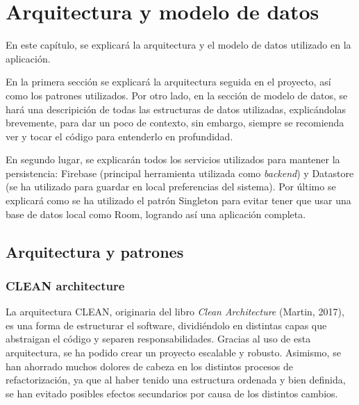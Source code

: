\chapter{Arquitectura y modelo de datos}
\label{cap:modeloDeDatos}
En este capítulo, se explicará la arquitectura y el modelo de datos utilizado en la aplicación. 

En la primera sección se explicará la arquitectura seguida en el proyecto, así como los patrones utilizados. Por otro lado, en la sección de modelo de datos, se hará una descripición de todas las estructuras de datos utilizadas, explicándolas brevemente, para dar un poco de contexto, sin embargo, siempre se recomienda ver y tocar el código para entenderlo en profundidad. 

En segundo lugar, se explicarán todos los servicios utilizados para mantener la persistencia: Firebase (principal herramienta utilizada como \textit{backend}) y Datastore (se ha utilizado para guardar en local preferencias del sistema). Por último se explicará como se ha utilizado el patrón Singleton para evitar tener que usar una base de datos local como 
Room\hyperlink{cap:biblio}{}, logrando así una aplicación completa.
\section{Arquitectura y patrones}
\subsection{CLEAN architecture}
\label{subsec:cleanArch}
La arquitectura CLEAN, originaria del libro \textit{Clean Architecture} (Martin, 2017)\hyperlink{cap:biblio}{}, es una forma de estructurar el software, dividiéndolo en distintas capas que abstraigan el código y separen responsabilidades. Gracias al uso de esta arquitectura, se ha podido crear un proyecto escalable y robusto. Asimismo, se han ahorrado muchos dolores de cabeza en los distintos procesos de refactorización, ya que al haber tenido una estructura ordenada y bien definida, se han evitado posibles efectos secundarios por causa de los distintos cambios.

